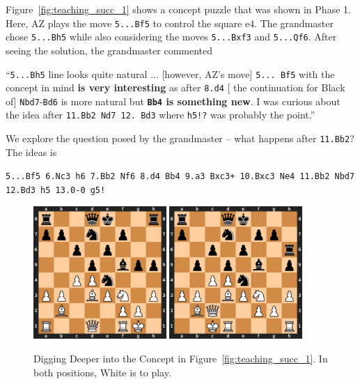 \documentclass{article}
\newcommand{\ct}[1]{\texttt{#1}}
\begin{document}
Figure~\ref{fig:teaching_succ_1} shows a concept puzzle that was shown in Phase 1. Here, AZ plays the move \ct{5...Bf5} to control the square e4. 
The grandmaster chose \ct{5...Bh5} while also considering the moves \ct{5...Bxf3} and \ct{5...Qf6}. 
After seeing the solution, the grandmaster commented 
\begin{displayquote}
``\ct{5...Bh5} line looks quite natural ... [however, AZ's move] \ct{5... Bf5} with the concept in mind \textbf{is very interesting} as after \ct{8.d4} [ the continuation for Black of] \ct{Nbd7}-\ct{Bd6} is more natural but \textbf{\ct{Bb4} is something new}. I was curious about the idea after \ct{11.Bb2 Nd7 12. Bd3} where \ct{h5!?} was probably the point.''
\end{displayquote}
We explore the question posed by the 
grandmaster -- what happens after \ct{11.Bb2}? The ideas is
\begin{displayquote}
\ct{5...Bf5 6.Nc3 h6 7.Bb2 Nf6 8.d4 Bb4 9.a3 Bxc3+ 10.Bxc3 Ne4 11.Bb2 Nbd7 12.Bd3 h5 13.0-0 g5!} 
\end{displayquote}


\begin{figure}[!ht]
\caption{Digging Deeper into the Concept in Figure~\ref{fig:teaching_succ_1}. In both positions, White is to play.}
\centering
\includegraphics[width=0.45\textwidth]{chess_positions/bf5_followup_short_castle.png}
\hspace{0.02\textwidth}
\includegraphics[width=0.45\textwidth]{chess_positions/bf5_followup_b5.png}
\label{fig:followup_left}
\end{figure}
\end{document}
